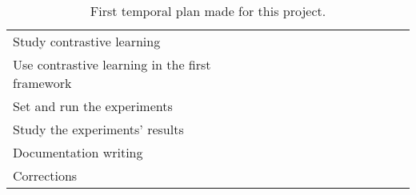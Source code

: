 \begin{table}[H]
{\begin{tabular}{lcccccc|cccccc}
        \multicolumn{1}{l|}{Study contrastive learning}                      &                                                 &                          &                          & \cellcolor[HTML]{036400} & \cellcolor[HTML]{036400} & \cellcolor[HTML]{036400} &                          &                          &                          &                          &                          &                          \\
        \multicolumn{1}{l|}{Use contrastive learning in the first framework} &                                                 &                          &                          &                          &                          & \cellcolor[HTML]{036400} & \cellcolor[HTML]{036400} & \cellcolor[HTML]{036400} &                          &                          &                          &                          \\
        \multicolumn{1}{l|}{Set and run the experiments}                     &                                                 &                          &                          &                          &                          &                          &                          & \cellcolor[HTML]{036400} & \cellcolor[HTML]{036400} &                          &                          &                          \\
        \multicolumn{1}{l|}{Study the experiments' results}                  &                                                 &                          &                          &                          &                          &                          &                          &                          & \cellcolor[HTML]{036400} & \cellcolor[HTML]{036400} & \cellcolor[HTML]{036400} &                          \\
        \multicolumn{1}{l|}{Documentation writing}                           &                                                 &                          &                          &                          &                          &                          &                          & \cellcolor[HTML]{036400} & \cellcolor[HTML]{036400} & \cellcolor[HTML]{036400} & \cellcolor[HTML]{036400} & \cellcolor[HTML]{036400} \\
        \multicolumn{1}{l|}{Corrections}                                     &                                                 &                          &                          &                          &                          &                          &                          &                          &                          &                          &                          & \cellcolor[HTML]{036400}
        \end{tabular}
    }
    \caption{First temporal plan made for this project.}
    \label{table:temp:plan:1}
    \end{table}

